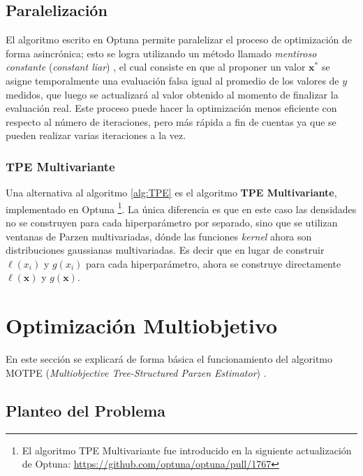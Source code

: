 \subsection*{Paralelización}
 
El algoritmo escrito en Optuna permite paralelizar el proceso de optimización de forma asincrónica; esto se logra utilizando un método llamado \textit{mentiroso constante} (\textit{constant liar}) \cite{NIPS2011_86e8f7ab}, el cual consiste en que al proponer un valor $\textbf{x}^*$ se asigne temporalmente una evaluación falsa igual al promedio de los valores de $y$ medidos, que luego se actualizará al valor obtenido al momento de finalizar la evaluación real. Este proceso puede hacer la optimización menos eficiente con respecto al número de iteraciones, pero más rápida a fin de cuentas ya que se pueden realizar varias iteraciones a la vez.

 
\subsubsection*{TPE Multivariante} 

Una alternativa al algoritmo \ref{alg:TPE} es el algoritmo \textbf{TPE Multivariante}, implementado en Optuna \footnote{El algoritmo TPE Multivariante fue introducido en la siguiente actualización de Optuna: \url{https://github.com/optuna/optuna/pull/1767}}. La única diferencia es que en este caso las densidades no se construyen para cada hiperparámetro por separado, sino que se utilizan ventanas de Parzen multivariadas, dónde las funciones \textit{kernel} ahora son distribuciones gaussianas multivariadas. Es decir que en lugar de construir $\ell(x_i)$ y $g(x_i)$ para cada hiperparámetro, ahora se construye directamente $\ell(\textbf{x})$ y $g(\textbf{x})$.


\section{Optimización Multiobjetivo}

En este sección se explicará de forma básica el funcionamiento del algoritmo MOTPE (\textit{Multiobjective Tree-Structured Parzen Estimator}) \cite{10.1613/jair.1.13188, 10.1145/3377930.3389817}.%

\subsection{Planteo del Problema}

